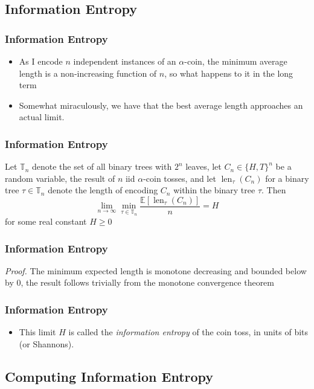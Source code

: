 \documentclass[xcolor=dvipsnames]{beamer}
\begin{document}
	
	\subsection{Information Entropy}
	
	
	\begin{frame}
	\frametitle{Information Entropy}
    	\begin{itemize}
    		\item As I encode $n$ independent instances of an $\alpha$-coin, the minimum average length is a non-increasing function of $n$, so what happens to it in the long term
        	\pause
        	\item Somewhat miraculously, we have that  the best average length approaches an actual limit. 
    	\end{itemize}
	\end{frame}
	
	\begin{frame}
	\frametitle{Information Entropy}
    	\begin{theorem}
	    Let $\mathbb{T}_n$ denote the set of all binary trees with $2^n$ leaves, let $C_n \in \{H, T\}^n$ be a random variable, the result of $n$ iid $\alpha$-coin tosses, and let $\operatorname{len}_\tau(C_n)$ for a binary tree $\tau \in \mathbb{T}_n$ denote the length of encoding $C_n$ within the binary tree $\tau$. Then $$ \lim_{n \to \infty}  \min_{\tau \in \mathbb{T}_n} \frac{\mathbb{E}[\operatorname{len}_{\tau}(C_n)]}{n} = H$$ for some real constant $H \geq 0$        	
	    \end{theorem}
	\end{frame}
	
	\begin{frame}
	\frametitle{Information Entropy}
    	\textit{Proof.} The minimum expected length is monotone decreasing and bounded below by 0, the result follows trivially from the monotone convergence theorem
	\end{frame}
	
	\begin{frame}
	\frametitle{Information Entropy}
	\begin{itemize}
	    \item This limit $H$ is called the \textit{information entropy} of the coin toss, in units of bits (or Shannons). 
	\end{itemize}
	\end{frame}
	
	
	\subsection{Computing Information Entropy}
	
\end{document}
